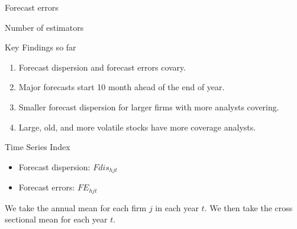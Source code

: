\documentclass[aspectratio=169]{beamer}
\begin{document}
\begin{frame}{Forecast errors }

\begin{table}[!htbp]
\centering
\resizebox{\linewidth}{!}{ %
\begin{threeparttable} %

\begin{tablenotes}
\footnotesize
\item 
\end{tablenotes}
\end{threeparttable}
} %
\end{table}

\end{frame}


\begin{frame}{Number of estimators }

\begin{table}[!htbp]
\centering
\resizebox{\linewidth}{!}{ %
\begin{threeparttable} %

\begin{tablenotes}
\footnotesize
\item 
\end{tablenotes}
\end{threeparttable}
} %
\end{table}

\end{frame}


\begin{frame}{Key Findings so far}
\begin{enumerate}

    \item Forecast dispersion and forecast errors covary.
    \item Major forecasts start 10 month ahead of the end of year.
    \item Smaller forecast dispersion for larger firms with more analysts covering.
    \item Large, old, and more volatile stocks have more coverage analysts. 

\end{enumerate}
\end{frame}

\begin{frame}{Time Series Index}

\begin{itemize}
    \item Forecast dispersion: $Fdis_{hjt}$
    \item Forecast errors: $FE_{hjt}$
\end{itemize}

\vspace{1em}
We take the annual mean for each firm $j$ in each year $t$. We then take the cross sectional mean for each year $t$. 


\end{frame}
\end{document}
